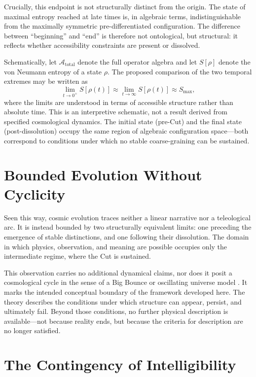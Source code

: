 \documentclass[12pt,a4paper]{article}
\begin{document}
Crucially, this endpoint is not structurally distinct from the origin. The state of maximal entropy reached at late times is, in algebraic terms, indistinguishable from the maximally symmetric pre-differentiated configuration. The difference between ``beginning'' and ``end'' is therefore not ontological, but structural: it reflects whether accessibility constraints are present or dissolved.

Schematically, let $\mathcal{A}_{\text{total}}$ denote the full operator algebra and let $S[\rho]$ denote the von Neumann entropy of a state $\rho$. The proposed comparison of the two temporal extremes may be written as
\begin{equation}
\lim_{t \to 0^+} S[\rho(t)] \approx \lim_{t \to \infty} S[\rho(t)] \approx S_{\max},
\end{equation}
where the limits are understood in terms of accessible structure rather than absolute time. This is an interpretive schematic, not a result derived from specified cosmological dynamics. The initial state (pre-Cut) and the final state (post-dissolution) occupy the same region of algebraic configuration space---both correspond to conditions under which no stable coarse-graining can be sustained.

\section*{Bounded Evolution Without Cyclicity}

Seen this way, cosmic evolution traces neither a linear narrative nor a teleological arc. It is instead bounded by two structurally equivalent limits: one preceding the emergence of stable distinctions, and one following their dissolution. The domain in which physics, observation, and meaning are possible occupies only the intermediate regime, where the Cut is sustained.

This observation carries no additional dynamical claims, nor does it posit a cosmological cycle in the sense of a Big Bounce or oscillating universe model \cite{Penrose2010}. It marks the intended conceptual boundary of the framework developed here. The theory describes the conditions under which structure can appear, persist, and ultimately fail. Beyond those conditions, no further physical description is available---not because reality ends, but because the criteria for description are no longer satisfied.

\section*{The Contingency of Intelligibility}
\end{document}
